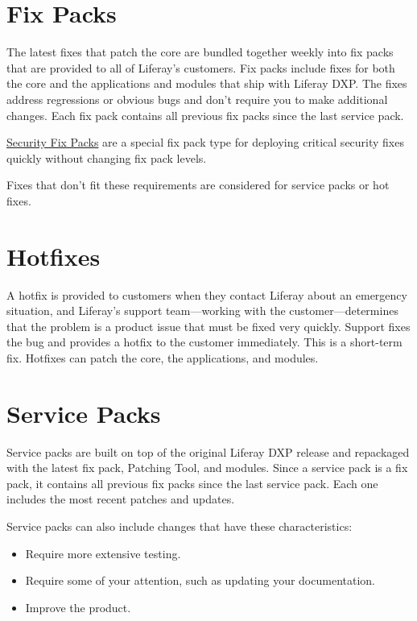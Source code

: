 \section{Fix Packs}\label{fix-packs}

The latest fixes that patch the core are bundled together weekly into
fix packs that are provided to all of Liferay's customers. Fix packs
include fixes for both the core and the applications and modules that
ship with Liferay DXP. The fixes address regressions or obvious bugs and
don't require you to make additional changes. Each fix pack contains all
previous fix packs since the last service pack.

\href{https://help.liferay.com/hc/en-us/articles/360035038331}{Security
Fix Packs} are a special fix pack type for deploying critical security
fixes quickly without changing fix pack levels.

Fixes that don't fit these requirements are considered for service packs
or hot fixes.

\section{Hotfixes}\label{hotfixes}

A hotfix is provided to customers when they contact Liferay about an
emergency situation, and Liferay's support team---working with the
customer---determines that the problem is a product issue that must be
fixed very quickly. Support fixes the bug and provides a hotfix to the
customer immediately. This is a short-term fix. Hotfixes can patch the
core, the applications, and modules.

\section{Service Packs}\label{service-packs}

Service packs are built on top of the original Liferay DXP release and
repackaged with the latest fix pack, Patching Tool, and modules. Since a
service pack is a fix pack, it contains all previous fix packs since the
last service pack. Each one includes the most recent patches and
updates.

Service packs can also include changes that have these characteristics:

\begin{itemize}
\tightlist
\item
  Require more extensive testing.
\item
  Require some of your attention, such as updating your documentation.
\item
  Improve the product.
\end{itemize}

